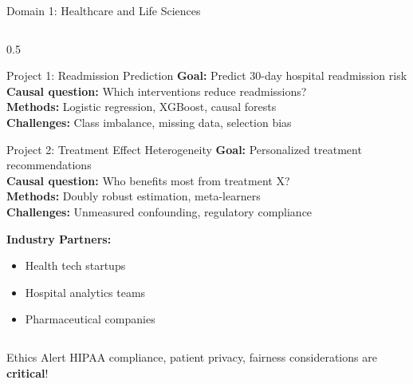 \begin{frame}{Domain 1: Healthcare and Life Sciences}
\begin{columns}
\begin{column}{0.5\textwidth}
\begin{block}{Project 1: Readmission Prediction}
\textbf{Goal:} Predict 30-day hospital readmission risk\\
\textbf{Causal question:} Which interventions reduce readmissions?\\
\textbf{Methods:} Logistic regression, XGBoost, causal forests\\
\textbf{Challenges:} Class imbalance, missing data, selection bias
\end{block}

\vspace{0.2cm}

\begin{block}{Project 2: Treatment Effect Heterogeneity}
\textbf{Goal:} Personalized treatment recommendations\\
\textbf{Causal question:} Who benefits most from treatment X?\\
\textbf{Methods:} Doubly robust estimation, meta-learners\\
\textbf{Challenges:} Unmeasured confounding, regulatory compliance
\end{block}

\vspace{0.2cm}

\textbf{Industry Partners:}
\begin{itemize}
\item Health tech startups
\item Hospital analytics teams
\item Pharmaceutical companies
\end{itemize}
\end{column}
\end{columns}

\vspace{0.2cm}
\begin{alertblock}{Ethics Alert}
HIPAA compliance, patient privacy, fairness considerations are \textbf{critical}!
\end{alertblock}
\end{frame}


